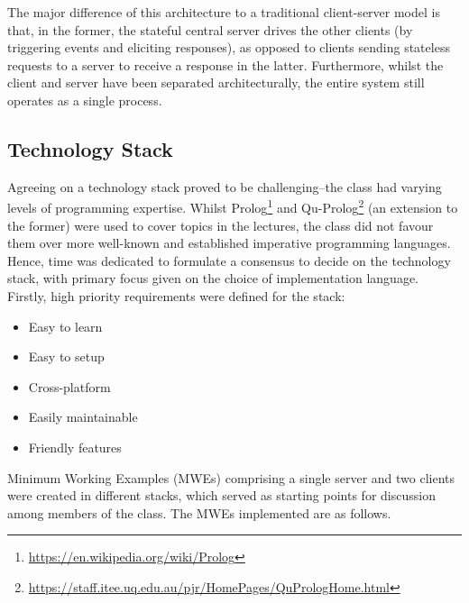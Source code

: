 The major difference of this architecture to a traditional client-server model is that, in the former, the stateful central server drives the other clients (by triggering events and eliciting responses), as opposed to clients sending stateless requests to a server to receive a response in the latter. Furthermore, whilst the client and server have been separated architecturally, the entire system still operates as a single process.

\subsection{Technology Stack}
\label{sec:GD:implementation:techstack}

Agreeing on a technology stack proved to be challenging--the class had varying levels of programming expertise. Whilst Prolog\footnote{\url{https://en.wikipedia.org/wiki/Prolog}} and Qu-Prolog\footnote{\url{https://staff.itee.uq.edu.au/pjr/HomePages/QuPrologHome.html}} (an extension to the former) were used to cover topics in the lectures, the class did not favour them over more well-known and established imperative programming languages. Hence, time was dedicated to formulate a consensus to decide on the technology stack, with primary focus given on the choice of implementation language. Firstly, high priority requirements were defined for the stack:

\begin{itemize}
    \item Easy to learn
    \item Easy to setup
    \item Cross-platform
    \item Easily maintainable
    \item Friendly features
\end{itemize}

Minimum Working Examples (MWEs) comprising a single server and two clients were created in different stacks, which served as starting points for discussion among members of the class. The MWEs implemented are as follows.

